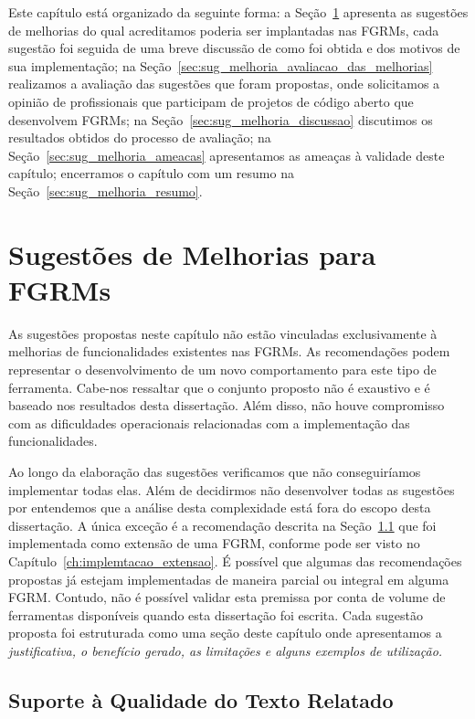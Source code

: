 Este capítulo está organizado da seguinte forma: a
Seção~\ref{sec:sug_melhoria_melhorando_as_ferraementas} apresenta as sugestões
de melhorias do qual acreditamos poderia ser implantadas nas FGRMs, cada
sugestão foi seguida de uma breve discussão de como foi obtida e dos motivos de
sua implementação; na Seção~\ref{sec:sug_melhoria_avaliacao_das_melhorias}
realizamos a avaliação das sugestões que foram propostas, onde solicitamos a
opinião de profissionais que participam de projetos de código aberto que
desenvolvem FGRMs; na Seção~\ref{sec:sug_melhoria_discussao} discutimos os
resultados obtidos do processo de avaliação; na
Seção~\ref{sec:sug_melhoria_ameacas} apresentamos as ameaças à validade deste
capítulo; encerramos o capítulo com um resumo na
Seção~\ref{sec:sug_melhoria_resumo}.

\section{Sugestões de Melhorias para FGRMs}
\label{sec:sug_melhoria_melhorando_as_ferraementas}

As sugestões propostas neste capítulo não estão vinculadas exclusivamente à
melhorias de funcionalidades existentes nas FGRMs. As recomendações podem
representar o desenvolvimento de um novo comportamento para este tipo de
ferramenta. Cabe-nos ressaltar que o conjunto proposto não é exaustivo e é
baseado nos resultados desta dissertação. Além disso, não houve compromisso com
as dificuldades operacionais relacionadas com a implementação das
funcionalidades.

Ao longo da elaboração das sugestões verificamos que não conseguiríamos
implementar todas elas. Além de decidirmos não desenvolver todas as sugestões
por entendemos que a análise desta complexidade está fora do escopo desta
dissertação. A única exceção é a recomendação descrita na
Seção~\ref{sub:supote_a_qualidade_do_relato} que foi implementada como extensão
de uma FGRM, conforme pode ser visto no Capítulo~\ref{ch:implemtacao_extensao}.
É possível que algumas das recomendações propostas já estejam implementadas de
maneira parcial ou integral em alguma FGRM\@. Contudo, não é possível validar
esta premissa por conta de volume de ferramentas disponíveis quando esta
dissertação foi escrita. Cada sugestão proposta foi estruturada como uma seção
deste capítulo onde apresentamos a \textit{justificativa, o benefício gerado, as
    limitações e alguns exemplos de utilização.}

\subsection{Suporte à Qualidade do Texto Relatado}
\label{sub:supote_a_qualidade_do_relato}


